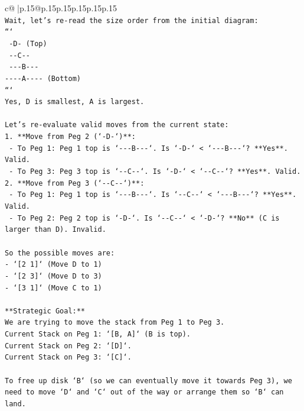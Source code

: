 \documentclass{article}
\begin{document}
{\begin{supertabular}{c@{$\;$}|p{.15\linewidth}@{}p{.15\linewidth}p{.15\linewidth}p{.15\linewidth}p{.15\linewidth}p{.15\linewidth}}
{{{\\ 
\texttt{Wait, let's re{-}read the size order from the initial diagram:} \\
\texttt{```} \\
\texttt{   {-}D{-}        (Top)} \\
\texttt{  {-}{-}C{-}{-}} \\
\texttt{ {-}{-}{-}B{-}{-}{-}} \\
\texttt{{-}{-}{-}{-}A{-}{-}{-}{-}     (Bottom)} \\
\texttt{```} \\
\texttt{Yes, D is smallest, A is largest.} \\
\\ 
\texttt{Let's re{-}evaluate valid moves from the current state:} \\
\texttt{1.  **Move from Peg 2 (`{-}D{-}`)**:} \\
\texttt{    {-}   To Peg 1: Peg 1 top is `{-}{-}{-}B{-}{-}{-}`. Is `{-}D{-}` < `{-}{-}{-}B{-}{-}{-}`? **Yes**. Valid.} \\
\texttt{    {-}   To Peg 3: Peg 3 top is `{-}{-}C{-}{-}`. Is `{-}D{-}` < `{-}{-}C{-}{-}`? **Yes**. Valid.} \\
\texttt{2.  **Move from Peg 3 (`{-}{-}C{-}{-}`)**:} \\
\texttt{    {-}   To Peg 1: Peg 1 top is `{-}{-}{-}B{-}{-}{-}`. Is `{-}{-}C{-}{-}` < `{-}{-}{-}B{-}{-}{-}`? **Yes**. Valid.} \\
\texttt{    {-}   To Peg 2: Peg 2 top is `{-}D{-}`. Is `{-}{-}C{-}{-}` < `{-}D{-}`? **No** (C is larger than D). Invalid.} \\
\\ 
\texttt{So the possible moves are:} \\
\texttt{{-} `{[}2 1{]}` (Move D to 1)} \\
\texttt{{-} `{[}2 3{]}` (Move D to 3)} \\
\texttt{{-} `{[}3 1{]}` (Move C to 1)} \\
\\ 
\texttt{**Strategic Goal:**} \\
\texttt{We are trying to move the stack from Peg 1 to Peg 3.} \\
\texttt{Current Stack on Peg 1: `{[}B, A{]}` (B is top).} \\
\texttt{Current Stack on Peg 2: `{[}D{]}`.} \\
\texttt{Current Stack on Peg 3: `{[}C{]}`.} \\
\\ 
\texttt{To free up disk `B` (so we can eventually move it towards Peg 3), we need to move `D` and `C` out of the way or arrange them so `B` can land.} \\
}}}
\end{supertabular}}
\end{document}
